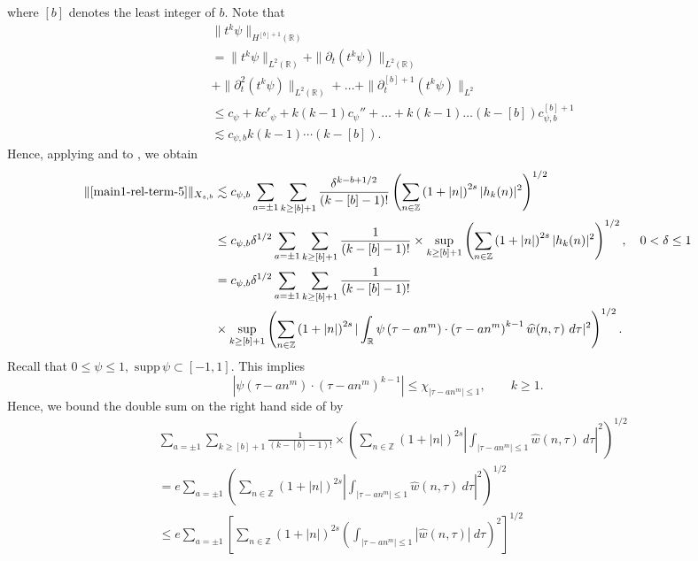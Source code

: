 \documentclass[12pt,reqno]{amsart}
\numberwithin{equation}{section}  %
\renewcommand{\cref}{\Cref}
\newcommand{\rr}{\mathbb{R}}
\newcommand{\zz}{\mathbb{Z}}
\newcommand{\wh}{\widehat}
\newcommand{\p}{\partial}
\begin{document}
%
%
where $[b]$ denotes the least integer of $b$. Note that
%
%
\begin{equation}
	\label{4n}
	\begin{split}
    & \|t^k \psi \|_{H^{[b] +1}(\rr)}
		\\
    & = \|t^k \psi\|_{L^2(\rr)} + \|\p_t (t^k \psi )
    \|_{L^2(\rr)} 
    \\
    & + \| \p_{t}^{2} (t^{k} \psi) \|_{L^{2}(\rr)} + \ldots + \|
    \p_{t}^{[b] + 1} (t^{k} \psi)\|_{L^{2}}
    \\
    & \le c_{\psi} + k c'_{\psi} + k (k -1) c_{\psi}'' + \ldots +
    k(k-1) \ldots (k - [b]) c_{\psi, b}^{[b] + 1}
    \\
    & \lesssim c_{\psi, b} k(k-1) \cdots (k - [b]).
	\end{split}
\end{equation}
%
%
Hence, applying \cref{3n} and \cref{4n} to \cref{2n}, we obtain
%
\begin{equation}
	\label{5n}
	\begin{split}
		\|\cref{main1-rel-term-5} \|_{X_{s,b}}
		& \lesssim c_{\psi, b} \sum_{a = \pm 1}
    \sum_{k \ge [b] +1} \frac{\delta^{k-b +1/2}}{(k-[b] - 1)!} \left( \sum_{n \in \zz} \left (1 + |n| \right )^{2s} | h_k(n) |^2 
		\right)^{1/2}
		\\
    & \le c_{\psi, b} \delta^{1/2} \sum_{a = \pm 1} \sum_{k \ge [b] +1} \frac{1}{(k-[b] - 1)!}
    \times \sup_{k \ge [b] + 1} \left( \sum_{n \in \zz} \left (1 + |n| \right )^{2s} | 
		h_k(n) |^2 \right)^{1/2}, \quad 0 < \delta \le 1
		\\
    & = c_{\psi, b} \delta^{1/2} \sum_{a = \pm 1}\sum_{k \ge [b] +1} \frac{1}{(k-[b] - 1)!}
    \\
    & \times \sup_{k \ge [b] + 1} 
		\left( \sum_{n \in \zz} \left (1 + |n| \right )^{2s} |\int_\rr 
		\psi\left( \tau - an^{m } \right) \cdot \left( \tau - an^{m } 
    \right)^{k -1} \wh{w}(n, \tau) \ d \tau|^{2} \right)^{1/2}.
    \end{split}
\end{equation}
%
Recall that $0 \le \psi \le 1, \text{ supp} \, \psi \subset [-1,1 ]$. 
This implies $$| \psi\left( \tau - an^{m } \right) \cdot \left( \tau - an^{m }
\right)^{k -1} | \le \chi_{| \tau - an^{m } | \le 1}, \qquad k \ge 1.$$ Hence,
we bound the double sum on the right hand side of \cref{5n} by
%
\begin{equation*}
	\begin{split}
    & \sum_{a = \pm 1}
    \sum_{k \ge [b] +1} \frac{1}{(k-[b] - 1)!}
    \times \left( \sum_{n \in \zz} (1 + | n |)^{2s}| 
		\int_{| \tau - an^{m}  |\le 1}  \wh{w}(n, \tau) \ d \tau |^2 
		\right)^{1/2}
    \\
    & = e \sum_{a = \pm 1} \left( \sum_{n \in \zz} (1 + | n |)^{2s}| 
		\int_{| \tau - an^{m}  |\le 1}  \wh{w}(n, \tau) \ d \tau |^2 
		\right)^{1/2}
    \\
    & \le e \sum_{a = \pm 1}
\left[ \sum_{n \in \zz} (1 + | n |)^{2s}\left (  
		\int_{| \tau - an^{m}  |\le 1} | \wh{w}(n, \tau) | \ d \tau \right ) ^2 
		\right]^{1/2}
	\end{split}
\end{equation*}
\end{document}
